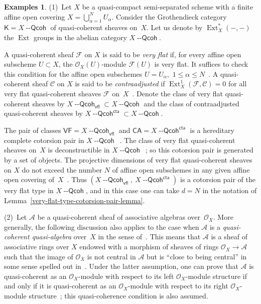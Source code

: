 \documentclass[12pt,a4paper]{amsart}
\newcommand{\+}{\nobreakdash-}
\renewcommand{\:}{\colon}
\newcommand{\rarrow}{\longrightarrow}
\DeclareMathOperator{\Ext}{Ext}
\newcommand{\Qcoh}{{\operatorname{\mathsf{--Qcoh}}}}
\newcommand{\sK}{\mathsf K}
\newcommand{\cA}{\mathcal A}
\newcommand{\cF}{\mathcal F}
\newcommand{\cC}{\mathcal C}
\newcommand{\cO}{\mathcal O}
\newcommand{\VF}{\mathsf{VF}}
\newcommand{\CA}{\mathsf{CA}}
\newcommand{\vfl}{\mathsf{vfl}}
\newcommand{\cta}{\mathsf{cta}}
\theoremstyle{plain}
\theoremstyle{definition}
\newtheorem{exs}[thm]{Examples}
\begin{document}
\begin{exs} \label{very-flat-and-very-flaprojective-in-qcoh-exs}
 (1)~Let $X$ be a quasi-compact semi-separated scheme with a finite
affine open covering $X=\bigcup_{\alpha=1}^N U_\alpha$.
 Consider the Grothendieck category $\sK=X\Qcoh$ of quasi-coherent
sheaves on~$X$.
 Let us denote by $\Ext_X^*({-},{-})$ the $\Ext$ groups in the abelian
category $X\Qcoh$.

 A quasi-coherent sheaf $\cF$ on $X$ is said to be \emph{very flat}
if, for every affine open subscheme $U\subset X$,
the $\cO_X(U)$\+module $\cF(U)$ is very flat.
 It suffices to check this condition for the affine open subschemes
$U=U_\alpha$, \,$1\le\alpha\le N$ \,\cite[Section~1.10]{Pcosh}.
 A quasi-coherent sheaf $\cC$ on $X$ is said to be \emph{contraadjusted}
if $\Ext^1_X(\cF,\cC)=0$ for all very flat quasi-coherent sheaves $\cF$
on~$X$ \,\cite[Section~2.5]{Pcosh}.
 Denote the class of very flat quasi-coherent sheaves by
$X\Qcoh_\vfl\subset X\Qcoh$ and the class of contraadjusted
quasi-coherent sheaves by $X\Qcoh^\cta\subset X\Qcoh$.

 The pair of classes $\VF=X\Qcoh_\vfl$ and $\CA=X\Qcoh^\cta$ is
a hereditary complete cotorsion pair in $X\Qcoh$
\,\cite[Corollary~4.1.4 and Lemma~B.1.2]{Pcosh}.
 The class of very flat quasi-coherent sheaves on~$X$ is deconstructible
in $X\Qcoh$ \,\cite[Lemma~B.3.5 and the beginning of the proof of
Lemma~5.1.1(a)]{Pcosh}; so this cotorsion pair is generated by a set
of objects.
 The projective dimensions of very flat quasi-coherent sheaves on $X$
do not exceed the number $N$ of affine open subschemes in any given
affine open covering of~$X$ \,\cite[Lemmas~4.7.1(b), 5.5.12(a,c),
and~B.1.9]{Pcosh}.
 Thus $(X\Qcoh_\vfl,\>X\Qcoh^\cta)$ is a cotorsion pair of the very flat
type in $X\Qcoh$, and in this case one can take $d=N$ in the notation
of Lemma~\ref{very-flat-type-cotorsion-pair-lemma}.

\smallskip
 (2)~Let $\cA$ be a quasi-coherent sheaf of associative algebras
over~$\cO_X$.
 More generally, the following discussion also applies to the case
when $\cA$ is a \emph{quasi-coherent quasi-algebra} over~$X$ in
the sense of~\cite[Section~3.1]{Pdomc}.
 This means that $\cA$ is a sheaf of associative rings over $X$
endowed with a morphism of sheaves of rings $\cO_X\rarrow\cA$ such
that the image of $\cO_X$ is not central in $\cA$ but is ``close
to being central'' in some sense spelled out
in~\cite[Sections~1.4\+-1.5]{Pdomc}.
 Under the latter assumption, one can prove that $\cA$ is
quasi-coherent as an $\cO_X$\+module with respect to its left
$\cO_X$\+module structure if and only if it is quasi-coherent as
an $\cO_X$\+module with respect to its right $\cO_X$\+module
structure~\cite[Lemma~3.2]{Pdomc}; this quasi-coherence condition
is also assumed.


\end{exs}
\end{document}
